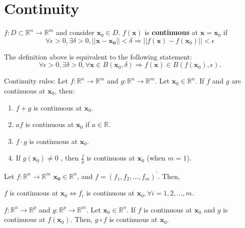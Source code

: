 \section{Continuity}

\begin{definition}[Continuity]
    \(f: D \subset \mathbb{R}^{n} \rightarrow \mathbb{R}^{m}\) and consider \(\mathbf{x}_{0} \in D\). \(f(\mathbf{x})\) is \textbf{continuous} at \(\mathbf{x} = \mathbf{x}_0\) if \[
        \forall \epsilon > 0, \exists \delta > 0, ||\mathbf{x}-\mathbf{x_0}|| < \delta \Longrightarrow ||f(\mathbf{x}) - f(\mathbf{x}_0)|| < \epsilon
    \]
\end{definition}

\begin{remark*}
    The definition above is equivalent to the following statement:
    \[
        \forall \epsilon > 0, \exists \delta > 0, \forall\mathbf{x} \in B(\mathbf{x}_0, \delta) \Longrightarrow f(\mathbf{x}) \in B(f(\mathbf{x}_0),\epsilon).
    \]
\end{remark*}

Continuity rules: Let \(f: \mathbb{R}^{n} \rightarrow \mathbb{R}^{m}\) and
\(g: \mathbb{R}^{n} \rightarrow \mathbb{R}^{m}\). Let
\(\mathbf{x}_{0} \in \mathbb{R}^{n}\). If \(f\) and \(g\) are
continuous at \(\mathbf{x}_{0}\), then:
\begin{enumerate}
    \item
          \(f + g\) is continuous at \(\mathbf{x}_{0}\).
    \item
          \(a f\) is continuous at \(\mathbf{x}_{0}\) if \(a \in \mathbb{R}\).
    \item
          \(f \cdot g\) is continuous at \(\mathbf{x}_{0}\).
    \item
          If \(g(\mathbf{x}_{0}) \neq 0\) , then \(\frac{f}{g}\) is continuous at \(\mathbf{x}_{0}\) (when \(m = 1\)).
\end{enumerate}


\begin{proposition}
    Let \(f:\mathbb{R}^{n}\rightarrow \mathbb{R}^{m}\) \(\mathbf{x_{0}}\in \mathbb{R}^{n}\), and \(f = (f_{1},f_{2},\ldots ,f_{m})^{\prime}\). Then,

    \(f\) is continuous at \(\mathbf{x}_{0}\iff f_{i}\) is continuous at \(\mathbf{x}_{0},\forall i = 1,2,\ldots ,m.\)
\end{proposition}


\begin{proposition}
    \(f:\mathbb{R}^{n}\rightarrow \mathbb{R}^{p}\) and \(g:\mathbb{R}^{p}\rightarrow \mathbb{R}^{m}\). Let \(\mathbf{x}_0\in \mathbb{R}^n\). If \(f\) is continuous at \(\mathbf{x}_0\) and \(g\) is continuous at \(f(\mathbf{x}_0)\). Then, \(g\circ f\) is continuous at \(\mathbf{x}_0\).
\end{proposition}

